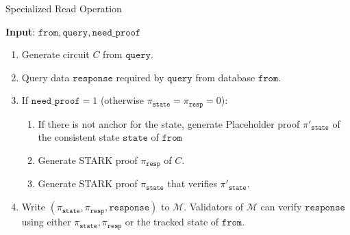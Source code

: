 \begin{algorithm}[h]
\caption{Specialized Read Operation}
\textbf{Input}: $\texttt{from}, \texttt{query}, \texttt{need\_proof}$
\begin{enumerate}
	\item Generate circuit $C$ from $\texttt{query}$.
	\item Query data $\texttt{response}$ required by $\texttt{query}$ from database $\texttt{from}$.
	\item If $\texttt{need\_proof} = 1$ (otherwise $\pi_{\texttt{state}} = \pi_{\texttt{resp}} = 0$):
	\begin{enumerate}
		\item If there is not anchor for the state, 
            generate Placeholder proof $\pi'_{\texttt{state}}$ of the consistent state $\texttt{state}$ of $\texttt{from}$
		\item Generate STARK proof $\pi_{\texttt{resp}}$ of $C$.
		\item Generate STARK proof $\pi_{\texttt{state}}$ that verifies $\pi'_{\texttt{state}}$.
	\end{enumerate}
	\item Write $(\pi_{\texttt{state}}, \pi_{\texttt{resp}}, \texttt{response})$ to $\mathcal{M}$.
			Validators of $\mathcal{M}$ can verify $\texttt{response}$ using either $\pi_{\texttt{state}}, \pi_{\texttt{resp}}$ or the tracked state of $\texttt{from}$. 
\end{enumerate}
\end{algorithm}


